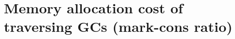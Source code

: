 \documentclass[11pt,dvipdfmx]{beamer}
\newif\ifja
\newif\ifeng
\newcommand{\ao}[1]{{\color{blue}#1}}
\begin{document}
\section{Memory allocation cost of traversing GCs
  (mark-cons ratio)}
\fi
\ifja
\begin{frame}
\frametitle{走査型GCのメモリ割り当てコスト}
\begin{itemize}
\item 大雑把には，
\begin{quote}
一回のGC時間 $\propto$ 到達可能だったオブジェクトの量
\end{quote}
\item 前提:
  \begin{itemize}
  \item ヒープの大きさ(copy GCならばsemi spaceの大きさ) $= \ao{M}$
  \item 到達可能なオブジェクトの量 $= \ao{r}$
  \item {\footnotesize 常に$r$というのは非現実的だがさしあたりそう仮定する}
  \end{itemize}
\item 挙動: 以下の繰り返し:
  \begin{enumerate}
  \item GC発生 $\rightarrow$ $r$ バイト スキャン(またはコピー)して; 
    $(M - r)$だけの空き領域を作る
  \item $(M - r)$バイト (GCせずに)割り当て
  \end{enumerate}
\begin{center}
\only<1>{\texttt{[image: out/pdf/svg/mark\_cons\_ratio\_0.pdf]}}%
\only<2>{\texttt{[image: out/pdf/svg/mark\_cons\_ratio\_1.pdf]}}%
\only<3->{\texttt{[image: out/pdf/svg/mark\_cons\_ratio\_2.pdf]}}%
\end{center}

\only<4>{\ao{\[ \therefore \mbox{1 バイト割り当てあたりのコスト} \propto \frac{r}{M - r} \]}}

\end{itemize}
\end{frame}
\fi
\ifeng
\end{document}
